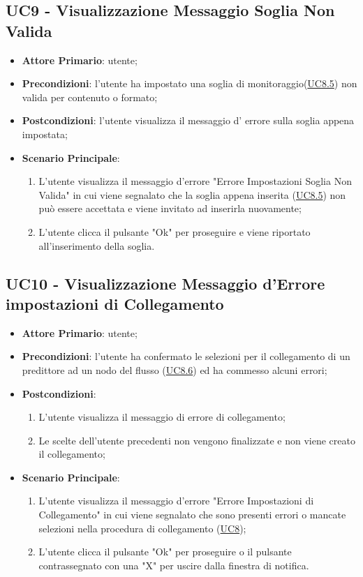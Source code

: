 	\subsection{UC9 - Visualizzazione Messaggio Soglia Non Valida}
		\begin{itemize}
			\item\textbf{Attore Primario}: utente;
			\item\textbf{Precondizioni}:  l’utente ha impostato una soglia di monitoraggio(\hyperref[par:UC8.5]{UC8.5}) non valida per contenuto o formato;
			\item\textbf{Postcondizioni}: l’utente visualizza il messaggio d' errore sulla soglia appena impostata;		
			\item\textbf{Scenario Principale}: 
				\begin{enumerate} 
					\item L’utente visualizza il messaggio d'errore "Errore Impostazioni Soglia Non Valida" in cui viene segnalato che la soglia appena inserita (\hyperref[par:UC8.5]{UC8.5}) non può essere accettata e viene invitato ad inserirla nuovamente;
					\item L'utente clicca il pulsante "Ok" per proseguire e viene riportato all'inserimento della soglia.		
				\end{enumerate}		
		\end{itemize}


	\label{par:UC10}
	\subsection{UC10 - Visualizzazione Messaggio d'Errore impostazioni di Collegamento}
		\begin{itemize}
			\item\textbf{Attore Primario}: utente;
			\item\textbf{Precondizioni}: l’utente ha confermato le selezioni per il collegamento di un predittore ad un nodo del flusso (\hyperref[par:UC8.6]{UC8.6}) ed ha commesso alcuni errori;
			\item\textbf{Postcondizioni}: 
				\begin{enumerate}
					\item L’utente visualizza il messaggio di errore di collegamento;
					\item Le scelte dell'utente precedenti non vengono finalizzate e non viene creato il collegamento; 
				\end{enumerate}		
			\item\textbf{Scenario Principale}: 
				\begin{enumerate} 
					\item L’utente visualizza il messaggio d'errore "Errore Impostazioni di Collegamento" in cui viene segnalato che sono presenti errori o mancate selezioni nella procedura di collegamento (\hyperref[par:UC8]{UC8});
					\item L'utente clicca il pulsante "Ok" per proseguire o il pulsante contrassegnato con una "X" per uscire dalla finestra di notifica.		
				\end{enumerate}		
		\end{itemize}

